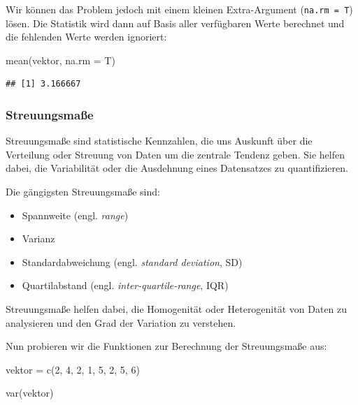 \documentclass[
]{book}
\newenvironment{Shaded}{\begin{snugshade}}{\end{snugshade}}
\newcommand{\AttributeTok}[1]{\textcolor[rgb]{0.77,0.63,0.00}{#1}}
\newcommand{\DecValTok}[1]{\textcolor[rgb]{0.00,0.00,0.81}{#1}}
\newcommand{\FunctionTok}[1]{\textcolor[rgb]{0.00,0.00,0.00}{#1}}
\newcommand{\NormalTok}[1]{#1}
\newcommand{\OtherTok}[1]{\textcolor[rgb]{0.56,0.35,0.01}{#1}}
\providecommand{\tightlist}{%
  \setlength{\itemsep}{0pt}\setlength{\parskip}{0pt}}
\begin{document}
Wir können das Problem jedoch mit einem kleinen Extra-Argument (\texttt{na.rm\ =\ T}) lösen. Die Statistik wird dann auf Basis aller verfügbaren Werte berechnet und die fehlenden Werte werden ignoriert:

\begin{Shaded}
\begin{Highlighting}[]
\FunctionTok{mean}\NormalTok{(vektor, }\AttributeTok{na.rm =}\NormalTok{ T)}
\end{Highlighting}
\end{Shaded}

\begin{verbatim}
## [1] 3.166667
\end{verbatim}

\hypertarget{streuungsmauxdfe}{%
\subsubsection{Streuungsmaße}\label{streuungsmauxdfe}}

Streuungsmaße sind statistische Kennzahlen, die uns Auskunft über die Verteilung oder Streuung von Daten um die zentrale Tendenz geben. Sie helfen dabei, die Variabilität oder die Ausdehnung eines Datensatzes zu quantifizieren.

Die gängigsten Streuungsmaße sind:

\begin{itemize}
\tightlist
\item
  Spannweite (engl. \emph{range})
\item
  Varianz
\item
  Standardabweichung (engl. \emph{standard deviation}, SD)
\item
  Quartilabstand (engl. \emph{inter-quartile-range}, IQR)
\end{itemize}

Streuungsmaße helfen dabei, die Homogenität oder Heterogenität von Daten zu analysieren und den Grad der Variation zu verstehen.

Nun probieren wir die Funktionen zur Berechnung der Streuungsmaße aus:

\begin{Shaded}
\begin{Highlighting}[]
\NormalTok{vektor }\OtherTok{=} \FunctionTok{c}\NormalTok{(}\DecValTok{2}\NormalTok{, }\DecValTok{4}\NormalTok{, }\DecValTok{2}\NormalTok{, }\DecValTok{1}\NormalTok{, }\DecValTok{5}\NormalTok{, }\DecValTok{2}\NormalTok{, }\DecValTok{5}\NormalTok{, }\DecValTok{6}\NormalTok{)}

\FunctionTok{var}\NormalTok{(vektor)}
\end{Highlighting}
\end{Shaded}
\end{document}
